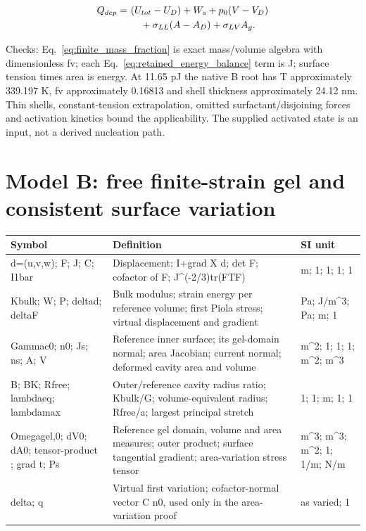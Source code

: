 \documentclass[11pt]{article}
\begin{document}
\begin{align}
Q_{dep}= & ~(U_{tot}-U_D)+W_s+p_0(V-V_D) \notag \\
& ~\quad+\sigma_{LL}(A-A_D)+\sigma_{LV}A_g. \label{eq:retained_energy_balance}
\end{align}

Checks: Eq.~\eqref{eq:finite_mass_fraction} is exact mass/volume algebra with dimensionless fv; each Eq.~\eqref{eq:retained_energy_balance} term is J; surface tension times area is energy. At 11.65 pJ the native B root has T approximately 339.197 K, fv approximately 0.16813 and shell thickness approximately 24.12 nm. Thin shells, constant-tension extrapolation, omitted surfactant/disjoining forces and activation kinetics bound the applicability. The supplied activated state is an input, not a derived nucleation path.

\section{Model B: free finite-strain gel and consistent surface variation}\label{sec:b-3d}

\begin{longtable}{p{.18\linewidth}p{.60\linewidth}p{.15\linewidth}}Symbol & Definition & SI unit\\\hline

d=(u,v,w); F; J; C; I1bar & Displacement; I+grad X d; det F; cofactor of F; J\textasciicircum{}(-2/3)tr(FTF) & m; 1; 1; 1; 1\\

Kbulk; W; P; deltad; deltaF & Bulk modulus; strain energy per reference volume; first Piola stress; virtual displacement and gradient & Pa; J/m\textasciicircum{}3; Pa; m; 1\\

Gammac0; n0; Js; ns; A; V & Reference inner surface; its gel-domain normal; area Jacobian; current normal; deformed cavity area and volume & m\textasciicircum{}2; 1; 1; 1; m\textasciicircum{}2; m\textasciicircum{}3\\

B; BK; Rfree; lambdaeq; lambdamax & Outer/reference cavity radius ratio; Kbulk/G; volume-equivalent radius; Rfree/a; largest principal stretch & 1; 1; m; 1; 1\\

Omegagel,0; dV0; dA0;  tensor-product ; grad t; Ps & Reference gel domain, volume and area measures; outer product; surface tangential gradient; area-variation stress tensor & m\textasciicircum{}3; m\textasciicircum{}3; m\textasciicircum{}2; 1; 1/m; N/m\\

delta; q & Virtual first variation; cofactor-normal vector C n0, used only in the area-variation proof & as varied; 1\\

\end{longtable}
\end{document}
